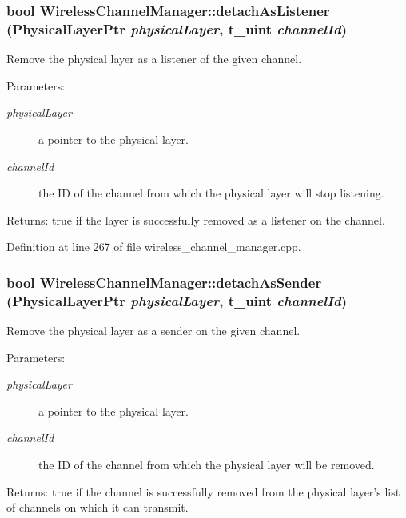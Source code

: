 \subsubsection{\setlength{\rightskip}{0pt plus 5cm}bool Wireless\-Channel\-Manager::detach\-As\-Listener (Physical\-Layer\-Ptr {\em physical\-Layer}, \bf{t\_\-uint} {\em channel\-Id})}\label{classWirelessChannelManager_e4f246bb2427df688ae55b693fd82ad4}


Remove the physical layer as a listener of the given channel. 

\begin{Desc}
\item[Parameters:]
\begin{description}
\item[{\em physical\-Layer}]a pointer to the physical layer. \item[{\em channel\-Id}]the ID of the channel from which the physical layer will stop listening. \end{description}
\end{Desc}
\begin{Desc}
\item[Returns:]true if the layer is successfully removed as a listener on the channel. \end{Desc}


Definition at line 267 of file wireless\_\-channel\_\-manager.cpp.
\subsubsection{\setlength{\rightskip}{0pt plus 5cm}bool Wireless\-Channel\-Manager::detach\-As\-Sender (Physical\-Layer\-Ptr {\em physical\-Layer}, \bf{t\_\-uint} {\em channel\-Id})}\label{classWirelessChannelManager_8652d5f6eb293be4d4475bbea3d1487b}


Remove the physical layer as a sender on the given channel. 

\begin{Desc}
\item[Parameters:]
\begin{description}
\item[{\em physical\-Layer}]a pointer to the physical layer. \item[{\em channel\-Id}]the ID of the channel from which the physical layer will be removed. \end{description}
\end{Desc}
\begin{Desc}
\item[Returns:]true if the channel is successfully removed from the physical layer's list of channels on which it can transmit. \end{Desc}


